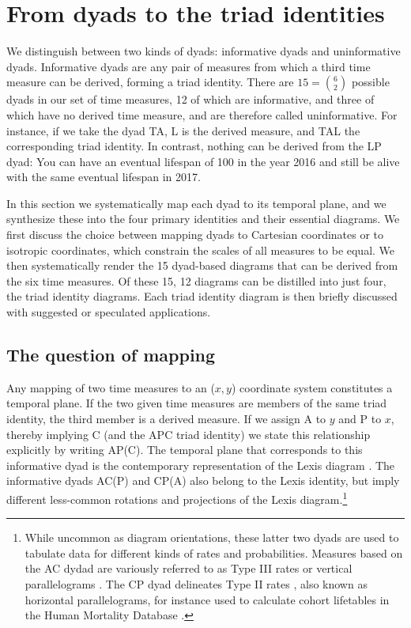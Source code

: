 \documentclass[12pt,oneside,a4paper]{article} %
\theoremstyle{definition}
\begin{document}

\section{From dyads to the triad identities}
\label{sec:dyads2diagrams}
We distinguish between two kinds of dyads: informative dyads and uninformative dyads. Informative dyads are any pair of measures from which a third time measure
can be derived, forming a triad identity. There are
$15=\binom{6}{2}$ possible dyads in our set of time measures, 12 of which are
informative, and three of which have no derived time measure, and are therefore
called uninformative. For instance, if we take the dyad TA, L is the derived
measure, and TAL the corresponding triad identity. In
contrast, nothing can be derived from the LP dyad: You can have an eventual lifespan of 100 in the year 2016 and still be alive with the same eventual lifespan in 2017.

In this section we systematically map each dyad to its temporal plane, and we
synthesize these into the four primary identities and their essential diagrams.
We first discuss the choice between mapping dyads to Cartesian coordinates or to
isotropic coordinates, which constrain the scales of all measures to be equal.
We then systematically render the 15 dyad-based diagrams that can be derived from the six time measures. Of these 15, 12 diagrams can be distilled into just four, the triad identity diagrams. Each
triad identity diagram is then briefly discussed with suggested or speculated
applications.

\subsection{The question of mapping}
Any mapping of two time measures to an ($x,y$) coordinate
system constitutes a temporal plane. If the two given time measures are members of the same triad identity, the third member is a derived
measure. If we assign A to $y$ and P to $x$, thereby implying C (and the APC
triad identity) we state this relationship explicitly by writing
AP(C).
The temporal plane that corresponds to this informative dyad is the contemporary representation of the
Lexis diagram \citep{lexis1875einleitung, pressat1961analyse}. The informative
dyads AC(P) and CP(A) also belong to the Lexis identity, but imply different
less-common rotations and projections of the Lexis diagram.\footnote{While
uncommon as diagram orientations, these latter two dyads are used to tabulate
data for different kinds of rates and probabilities. Measures
based on the AC dydad are variously referred to as Type III rates
\citep{caselli2005demography} or vertical parallelograms \citep{HMDMP}. The CP
dyad delineates Type II rates \citep{caselli2005demography}, also known as
horizontal parallelograms, for instance used to calculate cohort lifetables in the Human
Mortality Database \citep{HMDMP}. }
\end{document}
